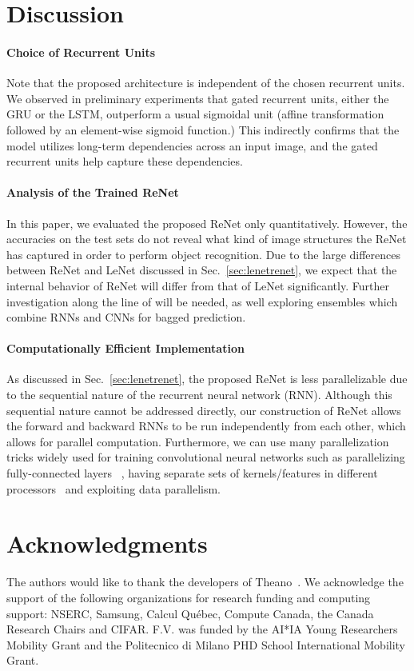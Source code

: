 \documentclass{article} \usepackage{nips15submit_e,times}
\begin{document}
\section{Discussion}

\paragraph{Choice of Recurrent Units}
Note that the proposed architecture is independent of the chosen recurrent
units. We observed in preliminary experiments that gated
recurrent units, either the GRU or the LSTM, outperform a usual sigmoidal unit
(affine transformation followed by an element-wise sigmoid function.) This
indirectly confirms that the model utilizes long-term dependencies across an
input image, and the gated recurrent units help capture these dependencies.

\paragraph{Analysis of the Trained ReNet}
In this paper, we evaluated the proposed ReNet only quantitatively. However, the
accuracies on the test sets do not reveal what kind of image structures the
ReNet has captured in order to perform object recognition. Due to the large
differences between ReNet and LeNet discussed in
Sec.~\ref{sec:lenetrenet}, we expect that the internal behavior of ReNet
will differ from that of LeNet significantly. Further investigation along
the line of \citep{ZeilerFergus14} will be needed, as well exploring ensembles
which combine RNNs and CNNs for bagged prediction.

\paragraph{Computationally Efficient Implementation}
As discussed in Sec.~\ref{sec:lenetrenet}, the proposed ReNet is less
parallelizable due to the sequential nature of the recurrent neural network
(RNN). Although this sequential nature cannot be addressed directly, our
construction of ReNet allows the forward and backward RNNs to be run
independently from each other, which allows for parallel computation.
Furthermore, we can use many parallelization tricks widely used for training
convolutional neural networks such as parallelizing fully-connected layers
~\citep{krizhevsky2014one}, having separate sets of kernels/features in
different processors~\citep{Krizhevsky-2012} and exploiting data parallelism.  

\section*{Acknowledgments}

The authors would like to thank the developers of
Theano~\citep{Bergstra2010,Bastien2012}. We acknowledge the support of the
following organizations for research funding and computing support: NSERC,
Samsung, Calcul Qu\'{e}bec, Compute Canada, the Canada Research Chairs and
CIFAR.  F.V. was funded by the AI*IA Young Researchers Mobility Grant
and the Politecnico di Milano PHD School International Mobility Grant.

\small

\end{document}
